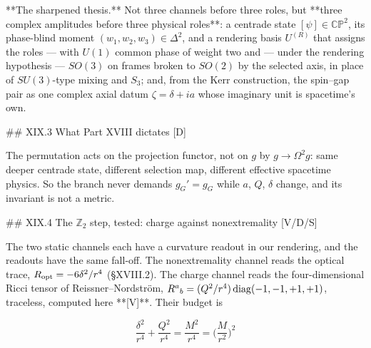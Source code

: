 **The sharpened thesis.** Not three channels before three roles, but **three complex amplitudes before three physical roles**: a centrade state $[\psi]\in\mathbb{CP}^2$, its phase-blind moment $(w_1,w_2,w_3)\in\Delta^2$, and a rendering basis $U^{(R)}$ that assigns the roles — with $U(1)$ common phase of weight two and — under the rendering hypothesis — $SO(3)$ on frames broken to $SO(2)$ by the selected axis, in place of $SU(3)$-type mixing and $S_3$; and, from the Kerr construction, the spin–gap pair as one complex axial datum $\zeta = \delta+ia$ whose imaginary unit is spacetime's own.

## XIX.3 What Part XVIII dictates [D]

The permutation acts on the projection functor, not on $g$ by $g\to\Omega^2g$: same deeper centrade state, different selection map, different effective spacetime physics. So the branch never demands $g_G' = g_G$ while $a$, $Q$, $\delta$ change, and its invariant is not a metric.

## XIX.4 The $\mathbb Z_2$ step, tested: charge against nonextremality [V/D/S]

The two static channels each have a curvature readout in our rendering, and the readouts have the same fall-off. The nonextremality channel reads the optical trace, $R_{\rm opt} = -6\delta^2/r^4$ (§XVIII.2). The charge channel reads the four-dimensional Ricci tensor of Reissner–Nordström, $R^a{}_b = (Q^2/r^4)\,{\rm diag}(-1,-1,+1,+1)$, traceless, computed here **[V]**. Their budget is

$$\frac{\delta^2}{r^4}+\frac{Q^2}{r^4} = \frac{M^2}{r^4} = \Big(\frac{M}{r^2}\Big)^2$$

